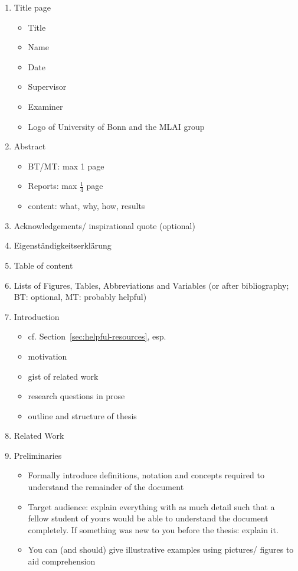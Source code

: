 \documentclass[nodate]{proc}
\begin{document}
\begin{enumerate}
	\item Title page
		\begin{itemize}
			\item Title
			\item Name
			\item Date
			\item Supervisor
			\item Examiner
			\item Logo of University of Bonn and the MLAI group
		\end{itemize}
	\item Abstract
		\begin{itemize}
			\item BT/MT: max 1 page
			\item Reports: max $\frac{1}{4}$ page
			\item content: what, why, how, results
		\end{itemize}
	\item Acknowledgements/ inspirational quote (optional)
	\item Eigenständigkeitserklärung
	\item Table of content
	\item Lists of Figures, Tables, Abbreviations and Variables (or after bibliography; BT: optional, MT: probably helpful)
	\item Introduction
		\begin{itemize}
			\item cf. Section~\ref{sec:helpful-resources}, esp. \cite{zobel_writing}
			\item motivation
			\item gist of related work
			\item research questions in prose
			\item outline and structure of thesis
		\end{itemize}
	\item Related Work
	\item Preliminaries
		\begin{itemize}
			\item Formally introduce definitions, notation and concepts required to understand the remainder of the document
			\item Target audience: explain everything with as much detail such that a fellow student of yours would be able to understand the document completely. If something was new to you before the thesis: explain it.
			\item You can (and should) give illustrative examples using pictures/ figures to aid comprehension

\end{itemize}
\end{enumerate}
\end{document}
